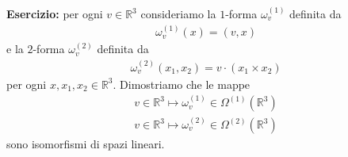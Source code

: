 \documentclass[twoside, 11pt]{amsbook}
\newcommand{\0}{{(0)}}
\newcommand{\3}{{(3)}}
\theoremstyle{colonplain}
\theoremstyle{colondefinition}
\theoremstyle{colonremark}
\numberwithin{equation}{chapter}
\begin{document}
\textbf{Esercizio:} per ogni $v \in \mathbb{R}^3$ consideriamo la $1$-forma $\omega^{(1)}_v$ definita da
\begin{align}
    \omega^{(1)}_v(x) = (v, x)
\end{align}
e la $2$-forma $\omega^{(2)}_v$ definita da
\begin{align}
    \omega^{(2)}_v(x_1, x_2) = v \cdot (x_1 \times x_2)
\end{align}
per ogni $x, x_1, x_2 \in \mathbb{R}^3$. Dimostriamo che le mappe 
\begin{align}\label{ScalProd}
    v \in \mathbb{R}^3 \mapsto \omega^{(1)}_v \in \Omega^{(1)}(\mathbb{R}^3) \\
    \label{MixProd}
    v \in \mathbb{R}^3 \mapsto \omega^{(2)}_v \in \Omega^{(2)}(\mathbb{R}^3)
\end{align}
sono isomorfismi di spazi lineari.
\end{document}
